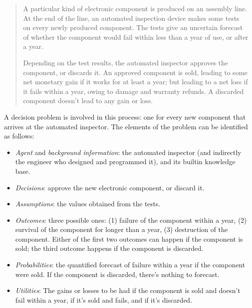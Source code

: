 \documentclass[
  a4paper,
  DIV=11,
  numbers=noendperiod,
  oneside]{scrreprt}
\providecommand{\tightlist}{%
  \setlength{\itemsep}{0pt}\setlength{\parskip}{0pt}}\usepackage{longtable,booktabs,array}
\begin{document}
\begin{tcolorbox}[enhanced jigsaw, rightrule=.15mm, colbacktitle=quarto-callout-note-color!10!white, coltitle=black, titlerule=0mm, title={Example}, colback=white, bottomrule=.15mm, toptitle=1mm, opacitybacktitle=0.6, toprule=.15mm, arc=.35mm, bottomtitle=1mm, colframe=quarto-callout-note-color-frame, breakable, left=2mm, opacityback=0, leftrule=.75mm]

\begin{quote}
A particular kind of electronic component is produced on an assembly
line. At the end of the line, an automated inspection device makes some
tests on every newly produced component. The tests give an uncertain
forecast of whether the component would fail within less than a year of
use, or after a year.

Depending on the test results, the automated inspector approves the
component, or discards it. An approved component is sold, leading to
some net monetary gain if it works for at least a year; but leading to a
net loss if it fails within a year, owing to damage and warranty
refunds. A discarded component doesn't lead to any gain or loss.\\
\end{quote}

A decision problem is involved in this process: one for every new
component that arrives at the automated inspector. The elements of the
problem can be identified as follows:

\begin{itemize}
\tightlist
\item
  \emph{Agent} and \emph{background information}: the automated
  inspector (and indirectly the engineer who designed and programmed
  it), and its builtin knowledge base.
\item
  \emph{Decisions}: approve the new electronic component, or discard it.
\item
  \emph{Assumptions}: the values obtained from the tests.
\item
  \emph{Outcomes}: three possible ones: (1) failure of the component
  within a year, (2) survival of the component for longer than a year,
  (3) destruction of the component. Either of the first two outcomes can
  happen if the component is sold; the third outcome happens if the
  component is discarded.
\item
  \emph{Probabilities}: the quantified forecast of failure within a year
  if the component were sold. If the component is discarded, there's
  nothing to forecast.
\item
  \emph{Utilities}: The gains or losses to be had if the component is
  sold and doesn't fail within a year, if it's sold and fails, and if
  it's discarded.
\end{itemize}

\end{tcolorbox}
\end{document}
